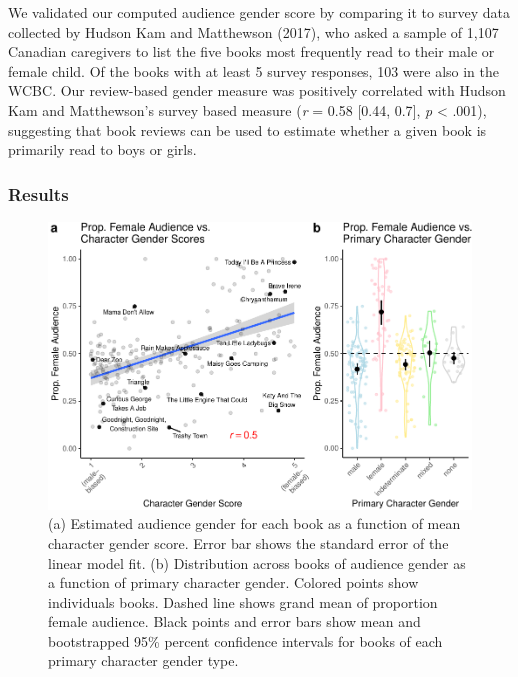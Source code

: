 \documentclass[
  english,
  ,man,floatsintext]{apa6}
\begin{document}
We validated our computed audience gender score by comparing it to survey data collected by Hudson Kam and Matthewson (2017), who asked a sample of 1,107 Canadian caregivers to list the five books most frequently read to their male or female child. Of the books with at least 5 survey responses, 103 were also in the WCBC. Our review-based gender measure was positively correlated with Hudson Kam and Matthewson's survey based measure (\emph{r} = 0.58 {[}0.44, 0.7{]}, \emph{p} \textless{} .001), suggesting that book reviews can be used to estimate whether a given book is primarily read to boys or girls.

\hypertarget{results-2}{%
\subsubsection{Results}\label{results-2}}

\begin{figure}[t!]
\includegraphics[width=\textwidth,]{figs/fig6.pdf} \caption{(a) Estimated audience gender for each book as a function of mean character gender score. Error bar shows the standard error of the linear model fit. (b) Distribution across books of audience gender as a function of primary character gender. Colored points show individuals books. Dashed line shows grand mean of proportion female audience. Black points and error bars show mean and bootstrapped 95\% percent confidence intervals for books of each primary character gender type.}\label{fig:characterplots}
\end{figure}
\end{document}
